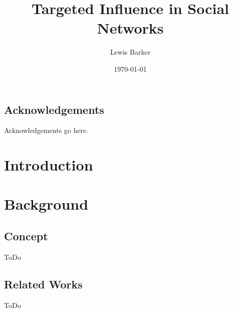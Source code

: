 \documentclass[bsc,frontabs,twoside,singlespacing,parskip,deptreport]{infthesis}     %
\begin{document}
\title{Targeted Influence in Social Networks}

\author{Lewis Barker}



\date{\today}


\maketitle

\section*{Acknowledgements}
Acknowledgements go here. 

\tableofcontents



\chapter{Introduction}


\chapter{Background}
\section{Concept}
ToDo
\section{Related Works}
ToDo
\end{document}
